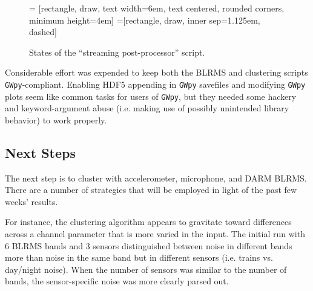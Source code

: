 \documentclass[colorlinks=true,pdfstartview=FitV,linkcolor=blue,
            citecolor=red,urlcolor=magenta]{ligodoc}
\begin{document}
\begin{figure}[h]
   = [rectangle, draw, text width=6em, text centered, rounded corners, minimum height=4em]
   =[rectangle, draw, inner sep=1.125em, dashed]
  \caption{States of the ``streaming post-processor'' script.}\label{fig:pp}
\end{figure}

Considerable effort was expended to keep both the BLRMS and clustering scripts \texttt{GWpy}-compliant.
Enabling HDF5 appending in \texttt{GWpy} savefiles and modifying \texttt{GWpy} plots seem like common tasks for users of \texttt{GWpy}, but they needed some hackery and keyword-argument abuse (i.e. making use of possibly unintended library behavior) to work properly.

\subsection{Next Steps}
The next step is to cluster with accelerometer, microphone, and DARM BLRMS.
There are a number of strategies that will be employed in light of the past few weeks' results.

For instance, the clustering algorithm appears to gravitate toward differences across a channel parameter that is more varied in the input.
The initial run with 6 BLRMS bands and 3 sensors distinguished between noise in different bands more than noise in the same band but in different sensors (i.e. trains vs. day/night noise).
When the number of sensors was similar to the number of bands, the sensor-specific noise was more clearly parsed out.
\end{document}
